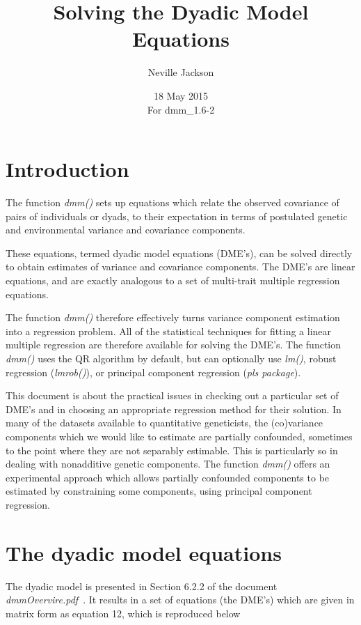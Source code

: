 \documentclass[titlepage]{article}  %
\title{ Solving the Dyadic Model Equations}
\author{Neville Jackson }
\date{18 May 2015 \\
      For dmm\_1.6-2}   %
\begin{document}
 
 
\maketitle      
\tableofcontents

\section{Introduction} 
The function {\em dmm()} sets up equations which relate the observed covariance of pairs of individuals or dyads, to their expectation in terms of postulated genetic and environmental variance and covariance components.

These equations, termed dyadic model equations (DME's), can be solved directly to obtain estimates of variance and covariance components.  The DME's are linear equations, and are exactly analogous to a set of multi-trait multiple regression equations. 

The function {\em dmm()} therefore effectively turns variance component estimation into a regression problem. All of the statistical techniques for fitting a linear multiple regression are therefore available for solving the DME's. The function {\em dmm()} uses the QR algorithm by default, but can optionally use {\em lm()}, robust regression ({\em lmrob()}), or principal component regression ({\em pls package}).

This document is about the practical issues in checking out a particular set of DME's and in choosing an appropriate regression method for their solution.  In many of the datasets available to quantitative geneticists, the (co)variance components which we would like to estimate are partially confounded, sometimes to the point where they  are not separably estimable. This is particularly so in dealing with nonadditive genetic components. The function {\em dmm()} offers an experimental approach which allows partially confounded components to be estimated by constraining some components, using principal component regression.
 
\section{The dyadic model equations}
The dyadic model is presented in Section 6.2.2  of the document {\em dmmOvervire.pdf}~\cite{jack:15}. It results in a set of equations (the DME's) which are given in matrix form as equation 12, which is reproduced below
\end{document}
